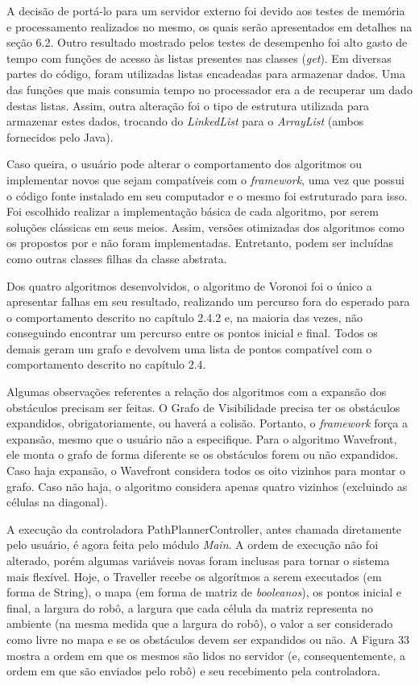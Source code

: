 A decisão de portá-lo para um servidor externo foi devido aos testes de memória e processamento realizados no mesmo, os quais serão apresentados em detalhes na seção 6.2. Outro resultado mostrado pelos testes de desempenho foi alto gasto de tempo com funções de acesso às listas presentes nas classes (\textit{get}). Em diversas partes do código, foram utilizadas listas encadeadas para armazenar dados. Uma das funções que mais consumia tempo no processador era a de recuperar um dado destas listas. Assim, outra alteração foi o tipo de estrutura utilizada para armazenar estes dados, trocando do \textit{LinkedList} para o \textit{ArrayList} (ambos fornecidos pelo Java).

Caso queira, o usuário pode alterar o comportamento dos algoritmos ou implementar novos que sejam compatíveis com o \textit{framework}, uma vez que possui o código fonte instalado em seu computador e o mesmo foi estruturado para isso. Foi escolhido realizar a implementação básica de cada algoritmo, por serem soluções clássicas em seus meios. Assim, versões otimizadas dos algoritmos como os propostos por \cite{Souza2008} e \cite{Medeiros2011} não foram implementadas. Entretanto, podem ser incluídas como outras classes filhas da classe abstrata.

Dos quatro algoritmos desenvolvidos, o algoritmo de Voronoi foi o único a apresentar falhas em seu resultado, realizando um percurso fora do esperado para o comportamento descrito no capítulo 2.4.2 e, na maioria das vezes, não conseguindo encontrar um percurso entre os pontos inicial e final. Todos os demais geram um grafo e devolvem uma lista de pontos compatível com o comportamento descrito no capítulo 2.4.

Algumas observações referentes a relação dos algoritmos com a expansão dos obstáculos precisam ser feitas. O Grafo de Visibilidade precisa ter os obstáculos expandidos, obrigatoriamente, ou haverá a colisão. Portanto, o \textit{framework} força a expansão, mesmo que o usuário não a especifique. Para o algoritmo Wavefront, ele monta o grafo de forma diferente se os obstáculos forem ou não expandidos. Caso haja expansão, o Wavefront considera todos os oito vizinhos para montar o grafo. Caso não haja, o algoritmo considera apenas quatro vizinhos (excluindo as células na diagonal).

A execução da controladora PathPlannerController, antes chamada diretamente pelo usuário, é agora feita pelo módulo \textit{Main}. A ordem de execução não foi alterado, porém algumas variáveis novas foram inclusas para tornar o sistema mais flexível. Hoje, o Traveller recebe os algorítmos a serem executados (em forma de String), o mapa (em forma de matriz de \textit{booleanos}), os pontos inicial e final, a largura do robô, a largura que cada célula da matriz representa no ambiente (na mesma medida que a largura do robô), o valor a ser considerado como livre no mapa e se os obstáculos devem ser expandidos ou não. A Figura 33 mostra a ordem em que os mesmos são lidos no servidor (e, consequentemente, a ordem em que são enviados pelo robô) e seu recebimento pela controladora.

